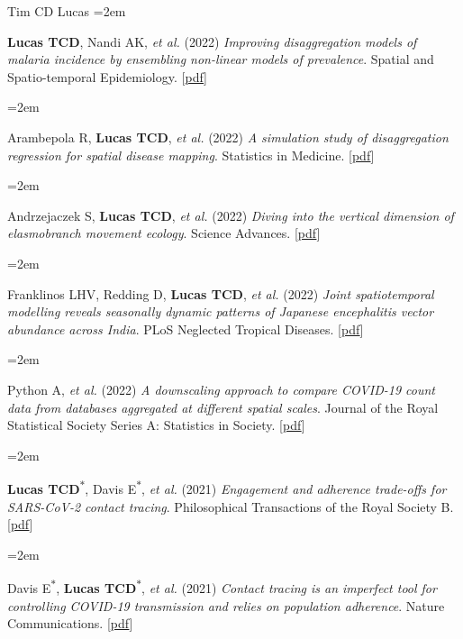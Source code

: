 \documentclass{scrartcl}
\newcommand{\MarginText}[1]{\marginpar{\raggedleft\itshape\small#1}} %
\newcommand{\Description}[1]{\hangindent=2em\hangafter=0\noindent\raggedright\footnotesize{#1}\par\normalsize\vspace{1em}} %
\begin{document}
\begin{cv}{Tim {\Large CD} Lucas}
\Description{\MarginText{2022}\textbf{Lucas TCD}, Nandi AK,  \emph{et al.} (2022) \emph{ Improving disaggregation models of malaria incidence by ensembling non-linear models of prevalence}. Spatial and Spatio-temporal Epidemiology. [\href{https://reader.elsevier.com/reader/sd/pii/S1877584520300356?token=A7B0EF0114C0A057AD7F1E13B7F97FE4D359B945C1F09211AC50B77D272216014E3E9881E3FBFC7D3CA8A8DD5A78846A}{pdf}]}


\Description{Arambepola R, \textbf{Lucas TCD},  \emph{et al.} (2022) \emph{A simulation study of disaggregation regression for spatial disease mapping}. Statistics in Medicine. [\href{https://onlinelibrary.wiley.com/doi/full/10.1002/sim.9220}{pdf}]}



\Description{Andrzejaczek S, \textbf{Lucas TCD}, \emph{et al.} (2022) \emph{Diving into the vertical dimension of elasmobranch movement ecology}. Science Advances. [\href{https://www.science.org/doi/full/10.1126/sciadv.abo1754}{pdf}]}


\Description{Franklinos LHV, Redding D, \textbf{Lucas TCD},  \emph{et al.} (2022) \emph{Joint spatiotemporal modelling reveals seasonally dynamic patterns of Japanese encephalitis vector abundance across India}. PLoS Neglected Tropical Diseases. [\href{https://journals.plos.org/plosntds/article?id=10.1371/journal.pntd.0010218}{pdf}]}

\Description{Python A,  \emph{et al.} (2022) \emph{A downscaling approach to compare COVID-19 count data from databases aggregated at different spatial scales}. Journal of the Royal Statistical Society Series A: Statistics in Society. [\href{https://academic.oup.com/jrsssa/article/185/1/202/7068448}{pdf}]}




\Description{\MarginText{2021}\textbf{Lucas TCD}\textsuperscript{$\ast$}, Davis E\textsuperscript{$\ast$}, \emph{et al.} (2021) \emph{Engagement and adherence trade-offs for SARS-CoV-2 contact tracing}. Philosophical Transactions of the Royal Society B. [\href{https://royalsocietypublishing.org/doi/10.1098/rstb.2020.0270}{pdf}]}



\Description{Davis E\textsuperscript{$\ast$}, \textbf{Lucas TCD}\textsuperscript{$\ast$}, \emph{et al.} (2021) \emph{Contact tracing is an imperfect tool for controlling COVID-19 transmission and relies on population adherence}. Nature Communications. [\href{https://www.nature.com/articles/s41467-021-25531-5}{pdf}]}




\end{cv}
\end{document}
